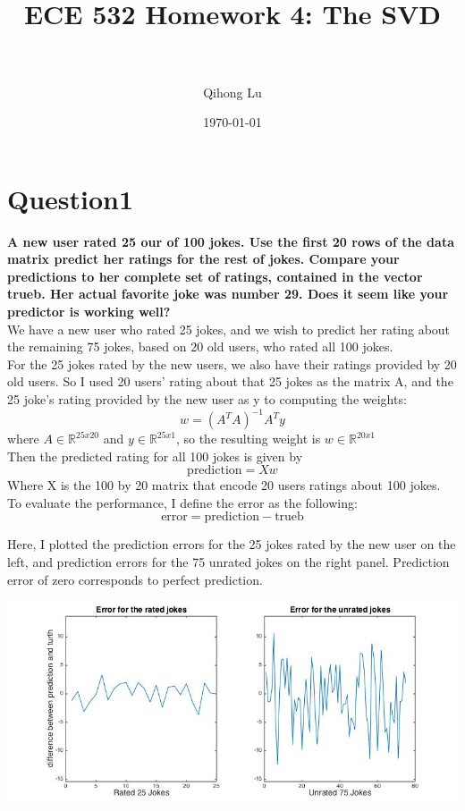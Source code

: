 \documentclass[paper=a4, fontsize=11pt]{scrartcl} %
\title{	
\normalfont \normalsize 
\horrule{0.5pt} \\[0.4cm] %
\huge ECE 532 Homework 4: The SVD \\ %
\horrule{2pt} \\[0.5cm] %
}
\author{Qihong Lu} %
\date{\normalsize\today} %
\numberwithin{equation}{section} %
\numberwithin{figure}{section} %
\numberwithin{table}{section} %
\begin{document}
\maketitle %


\section*{Question1}
\textbf{A new user rated 25 our of 100 jokes. Use the first 20 rows of the data matrix predict her ratings for the rest of jokes. Compare your predictions to her complete set of ratings, contained in the vector trueb. Her actual favorite joke was number 29. Does it seem like your predictor is working well?}\\

We have a new user who rated 25 jokes, and we wish to predict her rating about the remaining 75 jokes, based on 20 old users, who rated all 100 jokes. \\

For the 25 jokes rated by the new users, we also have their ratings provided by 20 old users. So I used 20 users' rating about that 25 jokes as the matrix A, and the 25 joke's rating provided by the new user as y to computing the weights: 
$$ w = (A^T A)^{-1} A^T y $$
where $ A \in \mathbb{R}^{25x20}$ and $ y \in \mathbb{R}^{25x1}$, so the resulting weight is $w \in \mathbb{R}^{20x1}$ \\

Then the predicted rating for all 100 jokes is given by
$$
\text{prediction} = X w
$$ 
Where X is the 100 by 20 matrix that encode 20 users ratings about 100 jokes. \\

To evaluate the performance, I define the error as the following: 
$$\text{error} = \text{prediction} - \text{trueb}$$


\newpage
Here, I plotted the prediction errors for the 25 jokes rated by the new user on the left, and prediction errors for the 75 unrated jokes on the right panel. Prediction error of zero corresponds to perfect prediction. 

\begin{center}
\includegraphics[scale=.6]{1_error.jpg}
\end{center}
\end{document}
